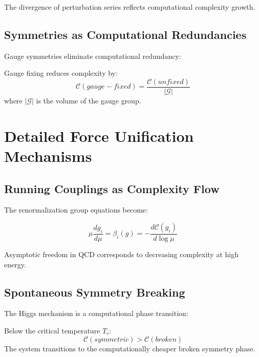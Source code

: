 \documentclass[12pt,a4paper]{article}
\newcommand{\comp}[1]{\mathcal{C}(#1)}
\begin{document}
The divergence of perturbation series reflects computational complexity growth.

\subsection{Symmetries as Computational Redundancies}

Gauge symmetries eliminate computational redundancy:

\begin{theorem}
Gauge fixing reduces complexity by:
\begin{equation}
\comp{gauge-fixed} = \frac{\comp{unfixed}}{|\mathcal{G}|}
\end{equation}
where $|\mathcal{G}|$ is the volume of the gauge group.
\end{theorem}

\section{Detailed Force Unification Mechanisms}

\subsection{Running Couplings as Complexity Flow}

The renormalization group equations become:

\begin{equation}
\mu \frac{d g_i}{d\mu} = \beta_i(g) = -\frac{d\comp{g_i}}{d\log\mu}
\end{equation}

Asymptotic freedom in QCD corresponds to decreasing complexity at high energy.

\subsection{Spontaneous Symmetry Breaking}

The Higgs mechanism is a computational phase transition:

\begin{theorem}
Below the critical temperature $T_c$:
\begin{equation}
\comp{symmetric} > \comp{broken}
\end{equation}
The system transitions to the computationally cheaper broken symmetry phase.
\end{theorem}
\end{document}
